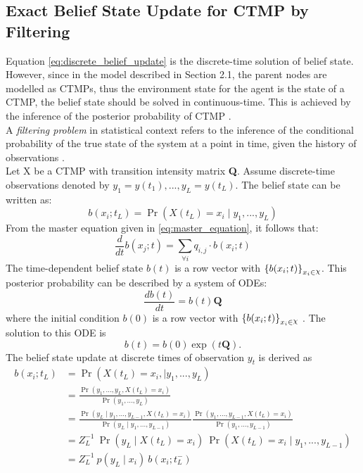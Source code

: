 \subsection{Exact Belief State Update for CTMP by Filtering}
\label{sec:filtering_CTMC}
Equation \ref{eq:discrete_belief_update} is the discrete-time solution of belief state. However, since in the model described in Section 2.1, the parent nodes are modelled as CTMPs, thus the environment state for the agent is the state of a CTMP, the belief state should be solved in continuous-time. This is achieved by the inference of the posterior probability of CTMP \cite{article}.\\
A \textit{filtering problem} in statistical context refers to the inference of the conditional probability of the true state of the system at a point in time, given the history of observations \cite{Godsill2019}.\\
Let X be a CTMP with transition intensity matrix \textbf{Q}. Assume discrete-time observations denoted by $ y_{1}=y(t_{1}), ..., y_{L}=y(t_{L}) $. The belief state can be written as:
\begin{equation}
b(x_{i};t_{L}) = \operatorname{Pr}(X(t_{L}) = x_{i} \mid y_{1}, ..., y_{L})
\end{equation}
From the master equation given in \autoref{eq:master_equation}, it follows that:
\begin{equation}
\frac{d}{dt} b(x_{j};t)  = \sum_{\forall i} q_{i,j} \cdot b(x_{i};t)
\end{equation}
The time-dependent belief state $ b(t) $ is a row vector with $ \left\lbrace b(x_{i};t)\right\rbrace_{x_{i} \in \rchi}  $.
This posterior probability can be described by a system of ODEs:
\begin{equation}
\frac{db(t)}{dt} = b(t)\textbf{Q}
\end{equation}
where the initial condition $ b(0) $ is a row vector with $ \left\lbrace b(x_{i};t)\right\rbrace_{x_{i} \in \rchi} $ \cite{article}. The solution to this ODE is
\begin{equation}
b(t) = b(0) \exp(t\textbf{Q}).
\label{eq:b_cont}
\end{equation}
The belief state update at discrete times of observation $ y_{t} $ is derived as 
\begin{align}
b(x_{i}; t_{L}) & = \operatorname{Pr}( X(t_{L}) = x_{i},\mid y_{1}, ..., y_{L}) \nonumber\\ & = \frac{\operatorname{Pr}(y_{1}, ..., y_{L}, X(t_{L}) = x_{i})}{\operatorname{Pr}(y_{1}, ..., y_{L})}  \nonumber\\ & = \frac{\operatorname{Pr}(y_{L} \mid y_{1}, ..., y_{L-1}, X(t_{L}) = x_{i})}{\operatorname{Pr}(y_{L} \mid y_{1}, ..., y_{L-1})} \frac{\operatorname{Pr}(y_{1}, ..., y_{L-1}, X(t_{L}) = x_{i})}{\operatorname{Pr}(y_{1}, ..., y_{L-1})}  \nonumber\\ & = Z_{L}^{-1} \ \operatorname{Pr}(y_{L} \mid X(t_{L})=x_{i})\ \operatorname{Pr}( X(t_{L}) = x_{i}\mid y_{1}, ..., y_{L-1})  \nonumber\\ & = Z_{L}^{-1}\ {p(y_{L} \mid x_{i})}\ {b(x_{i}; t_{L}^{-})}
\label{eq:b_jump}
\end{align}
